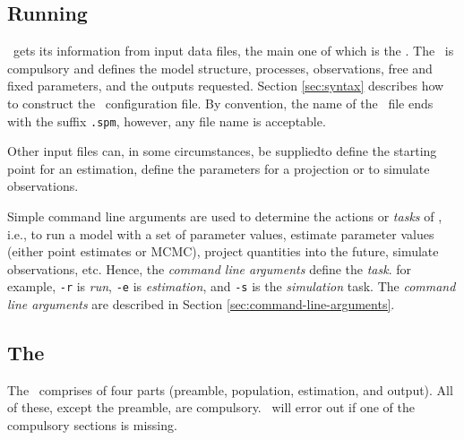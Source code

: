 \subsection{Running \SPM}

\SPM\ gets its information from input data files, the main one of which is the \config. The \config\ is compulsory and defines the model structure, processes, observations, free and fixed parameters, and the outputs requested. Section \ref{sec:syntax} describes how to construct the \SPM\ configuration file. By convention, the name of the \config\ file ends with the suffix \texttt{.spm}, however, any file name is acceptable.

Other input files can, in some circumstances, be supplied\textemdash to define the starting point for an estimation, define the parameters for a projection or to simulate observations.  

Simple command line arguments are used to determine the actions or \emph{tasks} of \SPM, i.e., to run a model with a set of parameter values, estimate parameter values (either point estimates or MCMC), project quantities into the future, simulate observations, etc. Hence, the \emph{command line arguments} define the \emph{task}. for example, \texttt{-r} is \emph{run}, \texttt{-e} is \emph{estimation}, and \texttt{-s} is the \emph{simulation} task. The \emph{command line arguments} are described in Section \ref{sec:command-line-arguments}.

\subsection{The \config\label{config-files}}

The \config\ comprises of four parts (preamble, population, estimation, and output). All of these, except the preamble, are compulsory. \SPM\ will error out if one of the compulsory sections is missing.

